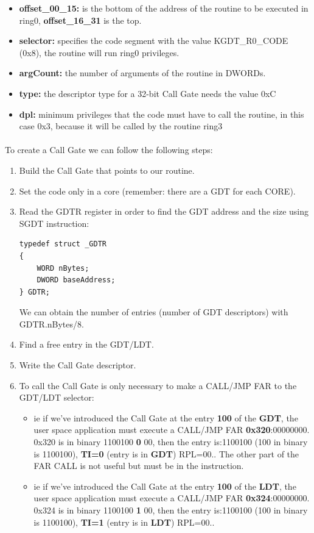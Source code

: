 \documentclass[12pt,a4paper,english]{book}
\newcommand{\paraph}{\paragraph{}}
\begin{document}
\begin{itemize}
\item {{\bf offset\_00\_15:} is the bottom of the address of the routine to be executed in ring0, {\bf offset\_16\_31} is the top.}
\item {{\bf selector:} specifies the code segment with the value KGDT\_R0\_CODE (0x8), the routine will run ring0 privileges.}
\item {{\bf argCount:} the number of arguments of the routine in DWORDs.}
\item {{\bf type:} the descriptor type for a 32-bit Call Gate needs the value 0xC}
\item {{\bf dpl:} minimum privileges that the code must have to call the routine, in this case 0x3, because it will be called by the routine ring3}
\end{itemize}

\paraph{}
To create a Call Gate we can follow the following steps:
\begin{enumerate}
\item {Build the Call Gate that points to our routine.}
\item {Set the code only in a core (remember: there are a GDT for each CORE).}
\item {Read the GDTR register in order to find the GDT address and the size using SGDT instruction:

\lstset{language=C,caption=GDTR register,label=DescriptiveLabels}
\begin{lstlisting}
typedef struct _GDTR
{
    WORD nBytes;
    DWORD baseAddress;
} GDTR;
\end{lstlisting}

We can obtain the number of entries (number of GDT descriptors) with GDTR.nBytes/8.
}
\item {Find a free entry in the GDT/LDT.}
\item {Write the Call Gate descriptor.}
\item { To call the Call Gate is only necessary to make a CALL/JMP FAR to the GDT/LDT selector:
\begin{itemize}
\item { ie if we've introduced the Call Gate at the entry {\bf 100} of the {\bf GDT}, the user space application must execute a CALL/JMP FAR {\bf 0x320}:00000000. 0x320 is in binary 1100100 {\bf 0} 00, then the entry is:1100100 (100 in binary is 1100100), {\bf TI=0} (entry is in {\bf GDT}) RPL=00.. The other part of the FAR CALL is not useful but must be in the instruction.}
\item { ie if we've introduced the Call Gate at the entry {\bf 100} of the {\bf LDT}, the user space application must execute a CALL/JMP FAR {\bf 0x324}:00000000. 0x324 is in binary 1100100 {\bf 1} 00, then the entry is:1100100 (100 in binary is 1100100), {\bf TI=1} (entry is in {\bf LDT}) RPL=00..}
\end{itemize}
}

\end{enumerate}
\end{document}

